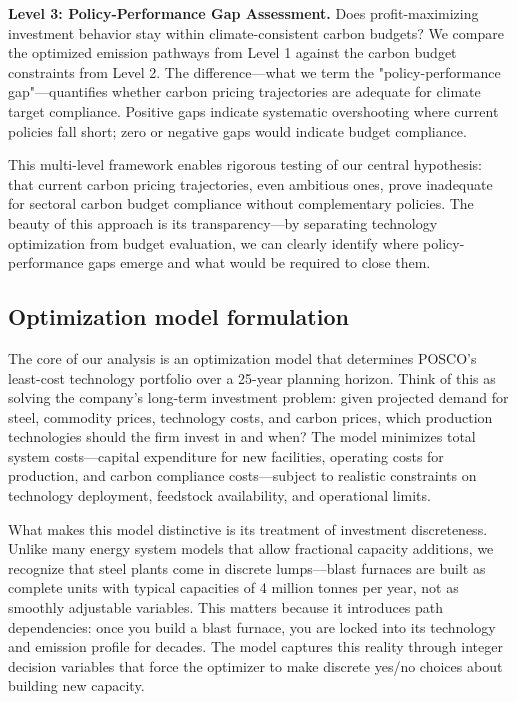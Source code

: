 \documentclass[preprint,1p,authoryear]{elsarticle}
\begin{document}
\textbf{Level 3: Policy-Performance Gap Assessment.} Does profit-maximizing investment behavior stay within climate-consistent carbon budgets? We compare the optimized emission pathways from Level 1 against the carbon budget constraints from Level 2. The difference—what we term the "policy-performance gap"—quantifies whether carbon pricing trajectories are adequate for climate target compliance. Positive gaps indicate systematic overshooting where current policies fall short; zero or negative gaps would indicate budget compliance.

This multi-level framework enables rigorous testing of our central hypothesis: that current carbon pricing trajectories, even ambitious ones, prove inadequate for sectoral carbon budget compliance without complementary policies. The beauty of this approach is its transparency—by separating technology optimization from budget evaluation, we can clearly identify where policy-performance gaps emerge and what would be required to close them.

\subsection{Optimization model formulation}

The core of our analysis is an optimization model that determines POSCO's least-cost technology portfolio over a 25-year planning horizon. Think of this as solving the company's long-term investment problem: given projected demand for steel, commodity prices, technology costs, and carbon prices, which production technologies should the firm invest in and when? The model minimizes total system costs—capital expenditure for new facilities, operating costs for production, and carbon compliance costs—subject to realistic constraints on technology deployment, feedstock availability, and operational limits.

What makes this model distinctive is its treatment of investment discreteness. Unlike many energy system models that allow fractional capacity additions, we recognize that steel plants come in discrete lumps—blast furnaces are built as complete units with typical capacities of 4 million tonnes per year, not as smoothly adjustable variables. This matters because it introduces path dependencies: once you build a blast furnace, you are locked into its technology and emission profile for decades. The model captures this reality through integer decision variables that force the optimizer to make discrete yes/no choices about building new capacity.
\end{document}
